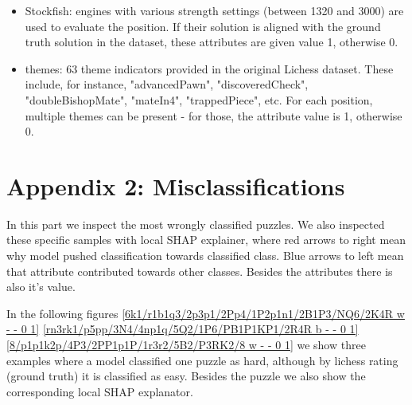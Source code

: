 \documentclass[11pt]{article}
\begin{document}
\begin{itemize}
\begin{itemize}
\item possible moves at level L: total number of legal moves at level L.
\item all possible moves: total number of legal moves at all levels.
\item all narrow solutions: sum of narrow solutions over all levels.
\item tree size: number of nodes in the meaningful search tree.
\item move ratio at level L: ratio between meaningful moves and possible moves. 
\item sum of distances over all levels.
\item average distance over all levels. 
\end{itemize}
\item Stockfish: engines with various strength settings (between 1320 and 3000) are used to evaluate the position. If their solution is aligned with the ground truth solution in the dataset, these attributes are given value 1, otherwise 0.
\item themes: 63 theme indicators provided in the original Lichess dataset. These include, for instance, "advancedPawn", "discoveredCheck", "doubleBishopMate", "mateIn4", "trappedPiece", etc. For each position, multiple themes can be present - for those, the attribute value is 1, otherwise 0.  
\end{itemize}













\clearpage

\section*{Appendix 2: Misclassifications}

In this part we inspect the most wrongly classified puzzles. We also inspected these specific samples with local SHAP 
explainer, where red arrows to right mean why model pushed classification towards classified class. Blue arrows to left 
mean that attribute contributed towards other classes. Besides the attributes there is also it's value. 

\vspace{10pt}
In the following figures \ref{6k1/r1b1q3/2p3p1/2Pp4/1P2p1n1/2B1P3/NQ6/2K4R w - - 0 1} \ref{rn3rk1/p5pp/3N4/4np1q/5Q2/1P6/PB1P1KP1/2R4R b - - 0 1} 
\ref{8/p1p1k2p/4P3/2PP1p1P/1r3r2/5B2/P3RK2/8 w - - 0 1}
we show three examples where a model classified one puzzle as hard, although by 
lichess rating (ground truth) it is classified as easy. Besides the puzzle we also show the corresponding local SHAP explanator.
\end{document}
